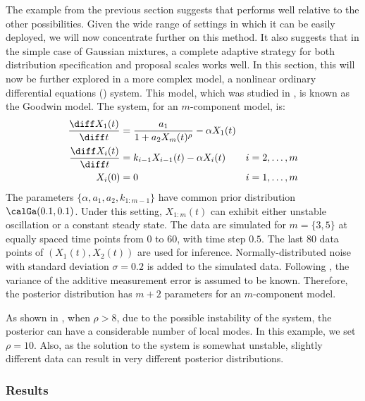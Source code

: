 The example from the previous section suggests that \smc[2] performs well
relative to the other \smc possibilities. Given the wide range of settings in
which it can be easily deployed, we will now concentrate further on this
method. It also suggests that in the simple case of Gaussian mixtures, a
complete adaptive strategy for both distribution specification and proposal
scales works well. In this section, this will now be further explored in a
more complex model, a nonlinear ordinary differential equations (\ode) system.
This model, which was studied in \cite{Calderhead:2009bd}, is known as the
Goodwin model. The \ode system, for an $m$-component model, is:
\begin{align*}
  \frac{\diff X_1(t)}{\diff t} &= \frac{a_1}{1 + a_2 X_m(t)^{\rho}}
  - \alpha X_1(t)  & \\
  \frac{\diff X_i(t)}{\diff t} &= k_{i-1}X_{i-1}(t) - \alpha X_i(t)
  & i = 2,\dots,m \\
  X_i(0) &= 0 & i = 1,\dots,m
\end{align*}
The parameters $\{\alpha,a_1,a_2,k_{1:m-1}\}$ have common prior distribution
$\calGa(0.1, 0.1)$. Under this setting, $X_{1:m}(t)$ can exhibit either
unstable oscillation or a constant steady state. The data are simulated for
$m=\{3,5\}$ at equally spaced time points from $0$ to $60$, with time step
$0.5$. The last 80 data points of $(X_1(t), X_2(t))$ are used for inference.
Normally-distributed noise with standard  deviation $\sigma=0.2$ is added to
the simulated data. Following \cite{Calderhead:2009bd}, the variance of the
additive measurement error is assumed to be known. Therefore, the posterior
distribution has $m+2$ parameters for an $m$-component model.

As shown in \cite{Calderhead:2009bd}, when $\rho > 8$, due to the possible
instability of the \ode system, the posterior can have a considerable number
of local modes. In this example, we set $\rho = 10$. Also, as the solution to
the \ode system is somewhat unstable, slightly different data can result in
very different posterior distributions.

\subsubsection{Results}

